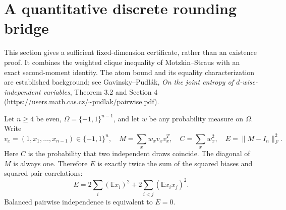 \section{A quantitative discrete rounding bridge}
\label{s10:sec:discrete-rounding}
This section gives a sufficient fixed-dimension certificate, rather than
an existence proof. It combines the weighted clique inequality of
Motzkin--Straus with an exact second-moment identity. The atom bound
and its equality characterization are established background; see
Gavinsky--Pudl\'ak, \emph{On the joint entropy of $d$-wise-independent
variables}, Theorem 3.2 and Section 4
(\url{https://users.math.cas.cz/~pudlak/pairwise.pdf}).


Let $n\ge4$ be even, $\Omega=\{-1,1\}^{n-1}$, and let $w$ be any
probability measure on $\Omega$. Write
\[
 v_x=(1,x_1,\ldots,x_{n-1})\in\{-1,1\}^n,\quad
 M=\sum_xw_xv_xv_x^T,\quad C=\sum_xw_x^2,\quad
 E=\|M-I_n\|_F^2.
\]
Here $C$ is the probability that two independent draws coincide.
The diagonal of $M$ is always one. Therefore $E$ is exactly twice
the sum of the squared biases and squared pair correlations:
\[
 E=2\sum_i(\mathbb E x_i)^2+
   2\sum_{i<j}(\mathbb E x_ix_j)^2.
\]
Balanced pairwise independence is equivalent to $E=0$.


